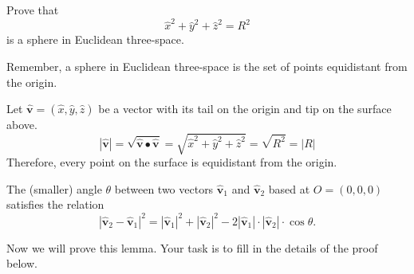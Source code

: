 \documentclass[newpage,hints,handout]{ximera}
\begin{document}
\begin{problem}
  Prove that
  \[
  \hat{x}^2 + \hat{y}^2 + \hat{z}^2 = R^2
  \]
  is a sphere in Euclidean three-space.
  
\begin{hint}
  Remember, a sphere in Euclidean three-space is the set of points equidistant
  from the origin.
\end{hint}

\begin{freeResponse}
Let $\hat{\mathbf v}= \left(\hat{x},\hat{y}, \hat{z}\right)$ be a vector with its tail on the origin and tip on the surface above.
\[
\left\vert \hat{\mathbf v}\right\vert = \sqrt{\hat{\mathbf v}\bullet \hat{\mathbf v}} = \sqrt{ \hat{x}^2+\hat{y}^2 + \hat{z}^2}= \sqrt{R^2} = \left\vert R \right\vert
\] 
Therefore, every point on the surface is equidistant from the origin.
\end{freeResponse}  
\end{problem}


\begin{lemma}
\label{110} The (smaller) angle $\theta$ between two
vectors $\hat{\mathbf v}_{1}$ and $\hat{\mathbf v}_{2}$ based at
$O=\left(0,0,0\right)$ satisfies the relation%
\[
\left\lvert \hat{\mathbf v}_{2}-\hat{\mathbf v}_{1}\right\rvert ^{2}
=\left\lvert \hat{\mathbf v}_{1}\right\rvert^{2}
+\left\lvert \hat{\mathbf v}_{2}\right\rvert^{2}
-2\left\lvert\hat{\mathbf v}_{1}\right\rvert \cdot
\left\lvert \hat{\mathbf v}_{2}\right\rvert \cdot \cos\theta.
\]
\end{lemma}

Now we will prove this lemma. Your task is to fill in the details of
the proof below.
\end{document}
